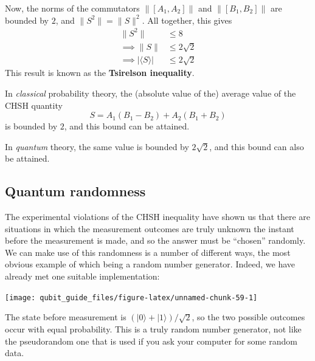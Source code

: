 \documentclass[fleqn,a4paper]{article}
\renewcommand{\footnote}[1]{\sidenotetext[{\color{white}0}\!\!]{\footnotesize #1}}
\newenvironment{idea}{\everypar{\setlength{\parindent}{1.5em}}}{}
\theoremstyle{definition}
\theoremstyle{definition}
\theoremstyle{definition}
\theoremstyle{definition}
\theoremstyle{remark}
\begin{document}
Now, the norms of the commutators \(\|[A_1, A_2]\|\) and \(\|[B_1, B_2]\|\) are bounded by\footnote{Exercise \ref{proving-tsirelsons-inequality}.} \(2\), and \(\|S^2\|=\|S\|^2\).
All together, this gives
\[
  \begin{aligned}
    \|S^2\|
    &\leqslant 8
  \\\implies \|S\|
    &\leqslant 2\sqrt{2}
  \\\implies |\langle S\rangle|
    &\leqslant 2\sqrt{2}
  \end{aligned}
\]
This result is known as the \textbf{Tsirelson inequality}.

\begin{idea}
In \emph{classical} probability theory, the (absolute value of the) average value of the CHSH quantity
\[
  S = A_1(B_1 - B_2) + A_2(B_1 + B_2)
\]
is bounded by \(2\), and this bound can be attained.

In \emph{quantum} theory, the same value is bounded by \(2\sqrt{2}\), and this bound can also be attained.

\end{idea}

\hypertarget{quantum-randomness}{%
\subsection{Quantum randomness}\label{quantum-randomness}}

The experimental violations of the CHSH inequality have shown us that there are situations in which the measurement outcomes are truly unknown the instant before the measurement is made, and so the answer must be ``chosen'' randomly.
We can make use of this randomness is a number of different ways, the most obvious example of which being a random number generator.
Indeed, we have already met one suitable implementation:

\begin{center}\texttt{[image: qubit\_guide\_files/figure-latex/unnamed-chunk-59-1]} \end{center}

The state before measurement is \((|0\rangle+|1\rangle)/\sqrt{2}\), so the two possible outcomes occur with equal probability.
This is a truly random number generator, not like the pseudorandom one that is used if you ask your computer for some random data.
\end{document}
